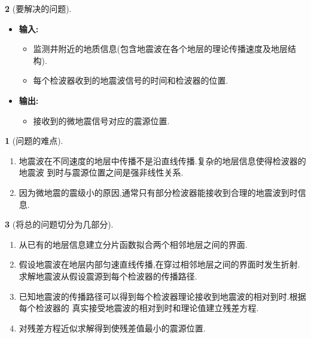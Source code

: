 \documentclass[UTF8]{ctexbeamer}	%
\theoremstyle{plain}
\theoremstyle{definition}
\newtheorem{emt}{}[section]
\theoremstyle{remark}
\numberwithin{equation}{section}
\begin{document}
\begin{frame}

  \begin{emt}[要解决的问题]
    \begin{itemize}
        \item \textbf{输入: }
        \begin{itemize}
            \item 监测井附近的地质信息(包含地震波在各个地层的理论传播速度及地层结构).
            \item 每个检波器收到的地震波信号的时间和检波器的位置.
        \end{itemize} 
        \item \textbf{输出: } 
        \begin{itemize}
            \item 接收到的微地震信号对应的震源位置. 
        \end{itemize}
    \end{itemize}

    \begin{emt}[问题的难点]
        \begin{enumerate}
            \item 地震波在不同速度的地层中传播不是沿直线传播.复杂的地层信息使得检波器的地震波
            到时与震源位置之间是强非线性关系.

            \item 因为微地震的震级小的原因,通常只有部分检波器能接收到合理的地震波到时信息.
            
        \end{enumerate}
        
    \end{emt}
      
  \end{emt}
\end{frame}






\begin{frame}
  \begin{emt}[将总的问题切分为几部分]
    \begin{enumerate}
        \item 从已有的地层信息建立分片函数拟合两个相邻地层之间的界面.
        \item 假设地震波在地层内部匀速直线传播,在穿过相邻地层之间的界面时发生折射.
        求解地震波从假设震源到每个检波器的传播路径.
        \item 已知地震波的传播路径可以得到每个检波器理论接收到地震波的相对到时.根据每个检波器的
        真实接受地震波的相对到时和理论值建立残差方程.
        \item 对残差方程近似求解得到使残差值最小的震源位置.
    \end{enumerate}
  \end{emt}
\end{frame}
\end{document}
